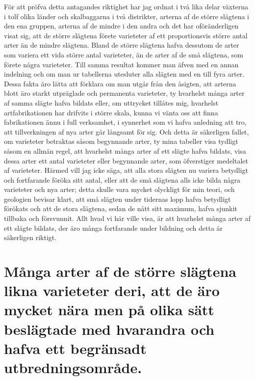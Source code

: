 För att pröfva detta antagandes riktighet har jag ordnat i två lika delar växterna i tolf olika länder och skalbaggarna i två distrikter, arterna af de större slägtena i den ena gruppen, arterna af de mindre i den andra och det har oföränderligen visat sig, att de större slägtena förete varieteter af ett proportionsvis större antal arter än de mindre slägtena. Bland de större slägtena hafva dessutom de arter som variera ett vida större antal varieteter, än de arter af de små slägtena, som förete några varieteter. Till samma resultat kommer man äfven med en annan indelning och om man ur tabellerna utesluter alla slägten med en till fyra arter. Dessa fakta äro lätta att förklara om man utgår från den åsigten, att arterna blott äro starkt utpräglade och permanenta varieteter, ty hvarhelst många arter af samma slägte hafva bildats eller, om uttrycket tillåtes mig, hvarhelst artfabrikationen har drifvits i större skala, kunna vi vänta oss att finna fabrikationen ännu i full verksamhet, i synnerhet som vi hafva anledning att tro, att tillverkningen af nya arter går långsamt för sig. Och detta är säkerligen fallet, om varieteter betraktas såsom begynnande arter, ty mina tabeller visa tydligt såsom en allmän regel, att hvarhelst många arter af ett slägte hafva bildats, visa dessa arter ett antal varieteter eller begynnande arter, som öfverstiger medeltalet af varieteter. Härmed vill jag icke säga, att alla stora slägten nu variera betydligt och fortfarande föröka sitt antal, eller att de små slägtena alls icke bilda några varieteter och nya arter; detta skulle vara mycket olyckligt för min teori, och geologien bevisar klart, att små slägten under tidernas lopp hafva betydligt förökats och att de stora slägtena, sedan de nått sitt maximum, hafva sjunkit tillbaka och försvunnit. Allt hvad vi här ville visa, är att hvarhelst många arter af ett slägte bildats, der äro många fortfarande under bildning och detta är säkerligen riktigt.



\section[Arter ur större slägten likna varieteter]{Många arter af de större slägtena likna varieteter 
deri, att de äro mycket nära men på olika sätt
beslägtade med hvarandra och hafva ett
begränsadt utbredningsområde.}


